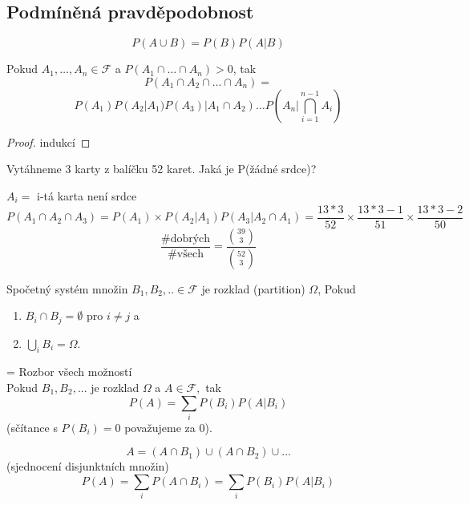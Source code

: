 \documentclass[../main.tex]{subfiles}
\begin{document}
\subsection{Podmíněná pravděpodobnost}
\begin{definition}
    \[P(A\cup B) = P(B)P(A|B)\]
\end{definition}

\begin{theorem}
    Pokud $A_1,\dots,A_n \in \mathcal{F}$ a $P(A_1\cap \dots \cap A_n) > 0$, tak
    \[P(A_1\cap A_2 \cap \dots \cap A_n) = \]
    \[P(A_1)P(A_2|A_1)P(A_3)|A_1\cap A_2) \dots P(A_n | \bigcap^{n-1}_{i=1} A_i)\]
\end{theorem}
\begin{proof}
    indukcí %
\end{proof}


\begin{example}
    Vytáhneme 3 karty z balíčku 52 karet. Jaká je P(žádné srdce)?

    $A_i =$ i-tá karta není srdce
    \[P(A_1\cap A_2 \cap A_3) = P(A_1) \times P(A_2 | A_1) P(A_3 | A_2\cap A_1) = \frac{13*3}{52} \times \frac{13*3 -1}{51} \times \frac{13*3 - 2}{50}\]
    \[\frac{\text{\#dobrých}}{\text{\#všech}} = \frac{\binom{39}{3}}{\binom{52}{3}}\]
\end{example}

\begin{definition}
    Spočetný systém množin $B_1,B_2,..\in \mathcal{F}$ je rozklad (partition) $\Omega$, Pokud
    \begin{enumerate}
        \item $B_i \cap B_j = \emptyset$ pro $i \neq j$ a
        \item $\bigcup_i B_i = \Omega$.
    \end{enumerate}
\end{definition}

\begin{theorem}
    = Rozbor všech možností
    \\ Pokud $B_1,B_2,...$ je rozklad $\Omega$ a $A \in \mathcal{F},$ tak
    \[P(A) = \sum_i P(B_i)P(A|B_i)\]
    (sčítance s $P(B_i) = 0$ považujeme za $0$).

    \[A = (A\cap B_1) \cup (A\cap B_2) \cup \dots\]
    (sjednocení disjunktních množin)
    \[P(A) = \sum_i P(A\cap B_i) = \sum_i P(B_i)P(A|B_i)\]
\end{theorem}
\end{document}
